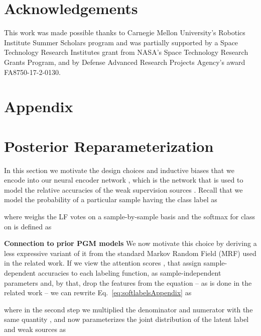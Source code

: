 \documentclass{article}
\begin{document}
\newpage
\section*{Acknowledgements}
This work was made possible thanks to Carnegie Mellon University's Robotics Institute Summer Scholars program and was partially supported by a Space Technology Research Institutes grant from NASA’s Space Technology Research Grants Program, and by Defense Advanced Research Projects Agency's award FA8750-17-2-0130.


 


\clearpage
\appendix
\section*{Appendix}
\section{Posterior Reparameterization}
\label{sec:appendixReparam}
In this section we motivate the design choices and inductive biases that we encode into our neural encoder network , which is the network that is used to model the relative accuracies of the weak supervision sources . 
Recall that we model the probability of a particular sample  having the class label  as

where  weighs the LF votes on a sample-by-sample basis and the softmax for class  on  is defined as

\textbf{Connection to prior PGM models} 
We now motivate this choice by deriving a less expressive variant of it from the standard Markov Random Field (MRF) used in the related work.
If we view the attention scores , that assign sample-dependent accuracies to each labeling function, as sample-independent parameters  and, by that, drop the features from the equation -- as is done in the related work \cite{DP, Multitask, triplets, TripletsMean} -- we can rewrite Eq.~\ref{eq:softlabelsAppendix} as 

where in the second step we multiplied the denominator and numerator with the same quantity , and  now parameterizes the joint distribution of the latent label and weak sources as 
 
\end{document}
